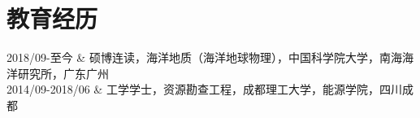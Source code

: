 \section{教育经历}

\begin{EntriesTable}{0.18}{0.02}{0.80}
2018/09-至今 & 硕博连读，海洋地质（海洋地球物理），中国科学院大学，南海海洋研究所，广东广州 \\
2014/09-2018/06 & 工学学士，资源勘查工程，成都理工大学，能源学院，四川成都
\end{EntriesTable}
